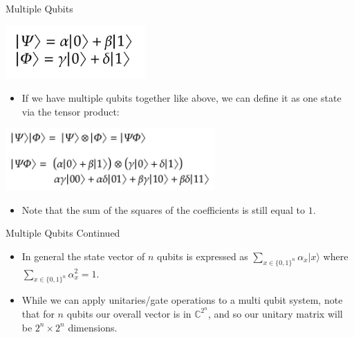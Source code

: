 \documentclass[aspectratio=169]{beamer}
\begin{document}
\begin{frame}{Multiple Qubits}
   \begin{center}
    \includegraphics[width=0.4\textwidth, height=0.4\textheight, keepaspectratio]{tensor1.PNG}
  \end{center}
  \begin{itemize}
    \item If we have multiple qubits together like above, we can define it as one state via the tensor product: \pause
  \end{itemize}
  \begin{center}
    \includegraphics[width=0.6\textwidth, height=0.6\textheight, keepaspectratio]{tensor2.PNG}
  \end{center} \pause
  \begin{itemize}
    \item Note that the sum of the squares of the coefficients is still equal to $1$.
  \end{itemize}
\end{frame}

\begin{frame}{Multiple Qubits Continued}
  \begin{itemize}
    \item In general the state vector of $n$ qubits is expressed as $\sum_{x \in \{0,1\}^n} \alpha_x |x\rangle$ where $\sum_{x \in \{0,1\}^n} \alpha_x^2 = 1$. \pause
    \item While we can apply unitaries/gate operations to a multi qubit system, note that for $n$ qubits our overall vector is in $\mathbb{C}^{2^n}$, and so our unitary matrix will be $2^n \times 2^n$ dimensions. 
  \end{itemize}
\end{frame}
\end{document}
